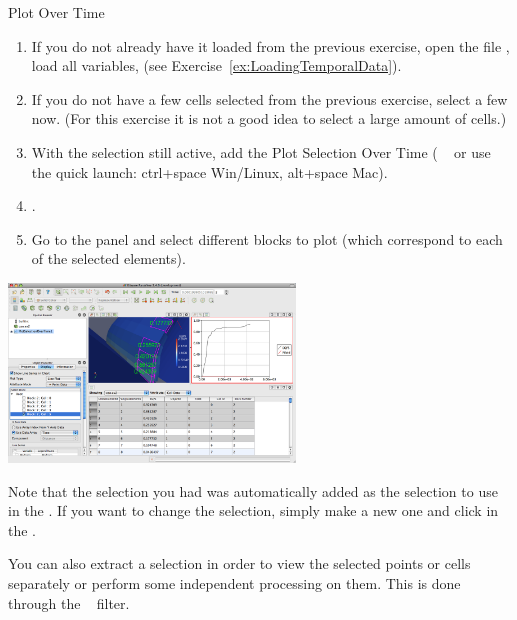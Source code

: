 \begin{exercise}{Plot Over Time}
  \label{ex:PlotOverTime}
  \begin{enumerate}
  \item If you do not already have it loaded from the previous exercise,
    open the file , load all variables, \apply (see
    Exercise~\ref{ex:LoadingTemporalData}).
  \item If you do not have a few cells selected from the previous exercise,
    select a few now. (For this exercise it is not a good idea to select a
    large amount of cells.)
  \item With the selection still active, add the Plot Selection Over Time
    ( \ra {} \ra {}~ or use the quick launch: ctrl+space
    Win/Linux, alt+space Mac). 
  \item \apply.
  \item Go to the  panel and select different blocks to plot
    (which correspond to each of the selected elements).
  \end{enumerate}

  \begin{inlinefig}
    \includegraphics[width=3in]{images/PlotSelectionOverTime}
  \end{inlinefig}

  Note that the selection you had was automatically added as the selection
  to use in the .  If you want to change the
  selection, simply make a new one and click  in
  the .
\end{exercise}

You can also extract a selection in order to view the selected points or
cells separately or perform some independent processing on them.  This is
done through the ~
filter.


